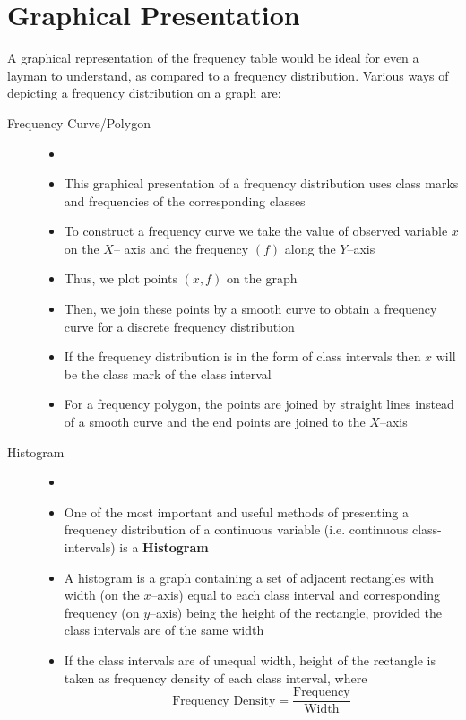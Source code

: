\documentclass[
10pt, %
a4paper, %
]{report}
\begin{document}
\section{Graphical Presentation}
A graphical representation of the frequency
table would be ideal for even a layman to
understand, as compared to a frequency distribution. Various ways of
depicting a frequency distribution on a graph are:
\begin{description}
\item[Frequency Curve/Polygon]
\begin{itemize}
\item []
\item  This graphical presentation of a frequency
distribution uses class marks and frequencies of
the corresponding classes
\item To construct a frequency curve we take the value of observed variable \(x\) on the \(X\)– axis and the frequency \((f)\) along the \(Y\)–axis
\item Thus, we plot points \((x, f)\) on the graph
\item Then, we join these points by a smooth curve to obtain a frequency curve for a discrete
frequency distribution
\item If the frequency distribution is in the form of class intervals then \(x\) will be the class mark of the class interval
\item For a frequency polygon, the points are joined by straight lines instead of a smooth curve and the end points are joined to the \(X\)–axis
\end{itemize}
\item[Histogram]
\begin{itemize}
\item[]
\item One of the most important and useful methods of presenting a frequency distribution of a continuous variable (i.e. continuous class-
intervals) is a \textbf{Histogram}
\item A histogram is a graph containing a set of
adjacent rectangles with width (on the \(x\)–axis) equal to each class interval and corresponding frequency (on \(y\)–axis) being the height of the rectangle, provided the class intervals are of the same width
\item If the class intervals are of unequal width, height of the rectangle is taken as frequency density of each class interval, where
\[
\text{Frequency Density} = \dfrac{\text{Frequency}}{\text{Width}}
\]
\end{itemize}

\end{description}
\end{document}
